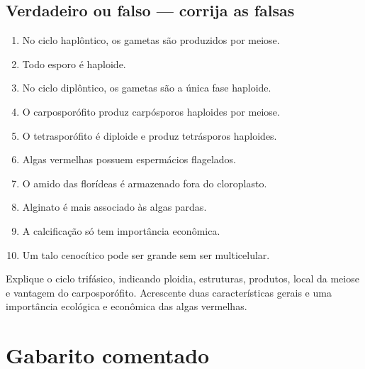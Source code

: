\documentclass[12pt,a4paper]{article}
\begin{document}
\subsection{Verdadeiro ou falso --- corrija as falsas}
\begin{enumerate}
\item No ciclo haplôntico, os gametas são produzidos por meiose.
\item Todo esporo é haploide.
\item No ciclo diplôntico, os gametas são a única fase haploide.
\item O carposporófito produz carpósporos haploides por meiose.
\item O tetrasporófito é diploide e produz tetrásporos haploides.
\item Algas vermelhas possuem espermácios flagelados.
\item O amido das florídeas é armazenado fora do cloroplasto.
\item Alginato é mais associado às algas pardas.
\item A calcificação só tem importância econômica.
\item Um talo cenocítico pode ser grande sem ser multicelular.
\end{enumerate}

\begin{raciocinio}[title={Questão discursiva-síntese}]
Explique o ciclo trifásico, indicando ploidia, estruturas, produtos, local da
meiose e vantagem do carposporófito. Acrescente duas características gerais e
uma importância ecológica e econômica das algas vermelhas.
\end{raciocinio}

\newpage
\section{Gabarito comentado}
\end{document}
